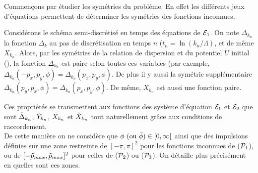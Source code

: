 \documentclass[10pt]{article}
\begin{document}
\begin{multicols}{2}
Commençons par étudier les symétries du problème. En effet les différents jeux d'équations permettent de déterminer les symétries des fonctions inconnues.



Considérons le schéma semi-discrétisé en temps des équations de $\mathcal{E}_1$. On note $\Delta_{k_n}$ la fonction $\Delta_k$ au pas de discrétisation en temps $n$ ($t_n = \ln(k_n/\Lambda)$, et de même $X_{k_n}$. Alors, par les symétries de la relation de dispersion et du potentiel $U$ initial (), la fonction $\Delta_{k_n}$ est paire selon toutes ces variables (par exemple, $\Delta_{k_n}(-p_x, p_y, \phi) = \Delta_{k_n}(p_x, p_y, \phi)$. De plus il y aussi la symétrie supplémentaire $\Delta_{k_n}(p_y, p_x, \phi) = \Delta_{k_n} (p_x, p_y, \phi)$. De même, $X_{k_n}$ est aussi une fonction paire. 

Ces propriétés se transmettent aux fonctions des système d'équation $\mathcal{E}_1$ et $\mathcal{E}_2$ que sont $\bar{\Delta}_{k_n}$, $\tilde{Y}_{k_n}$, $\bar{X}_{k_n}$ et $\tilde{X}_{k_n}$ tout naturellement grâce aux conditions de raccordement.\\
\indent
De cette manière on ne considère que $\phi \text{ (ou } \tilde{\phi}) \in [0, \infty[$ ainsi que des impulsions définies sur une zone restreinte de $[-\pi, \pi]^2$ pour les fonctions inconnues de ($\mathcal{P}_1$), ou de $[-\tilde{p}_{max}, \tilde{p}_{max}]^2$ pour celles de ($\mathcal{P}_2$) ou ($\mathcal{P}_3$). On détaille plus précisément en  quelles sont ces zones. \\



\end{multicols}
\end{document}
